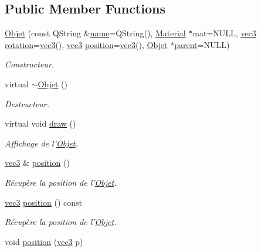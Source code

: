 \subsection*{Public Member Functions}
\begin{DoxyCompactItemize}
\item 
\hyperlink{class_objet_aea29e90dc963beb399d3028b7322039f}{Objet} (const Q\+String \&\hyperlink{class_objet_a4a702c189bedcbf1e65da6aec72c8e44}{name}=Q\+String(), \hyperlink{class_material}{Material} $\ast$mat=N\+U\+L\+L, \hyperlink{structvec3}{vec3} \hyperlink{class_objet_ac69a1b459bcb4433099c8cfbff06b209}{rotation}=\hyperlink{structvec3}{vec3}(), \hyperlink{structvec3}{vec3} \hyperlink{class_objet_a0e109bc790b14328202dd2546b04e2fd}{position}=\hyperlink{structvec3}{vec3}(), \hyperlink{class_objet}{Objet} $\ast$\hyperlink{class_objet_a95e63a98dc9dc485fe874df30f2069ee}{parent}=N\+U\+L\+L)
\begin{DoxyCompactList}\small\item\em Constructeur. \end{DoxyCompactList}\item 
virtual \hyperlink{class_objet_a77a195bb1452ef4221b5080632cd7757}{$\sim$\+Objet} ()
\begin{DoxyCompactList}\small\item\em Destructeur. \end{DoxyCompactList}\item 
virtual void \hyperlink{class_objet_a5cc323f562964e00b947b2d908e206e7}{draw} ()
\begin{DoxyCompactList}\small\item\em Affichage de l'\hyperlink{class_objet}{Objet}. \end{DoxyCompactList}\item 
\hyperlink{structvec3}{vec3} \& \hyperlink{class_objet_a0e109bc790b14328202dd2546b04e2fd}{position} ()
\begin{DoxyCompactList}\small\item\em Récupère la position de l'\hyperlink{class_objet}{Objet}. \end{DoxyCompactList}\item 
\hyperlink{structvec3}{vec3} \hyperlink{class_objet_a79051e09eb1aa72dcd338ed033e9f3f1}{position} () const 
\begin{DoxyCompactList}\small\item\em Récupère la position de l'\hyperlink{class_objet}{Objet}. \end{DoxyCompactList}\item 
void \hyperlink{class_objet_a89ed090c598f087792ee81c40ff46f75}{position} (\hyperlink{structvec3}{vec3} p)

\end{DoxyCompactItemize}
